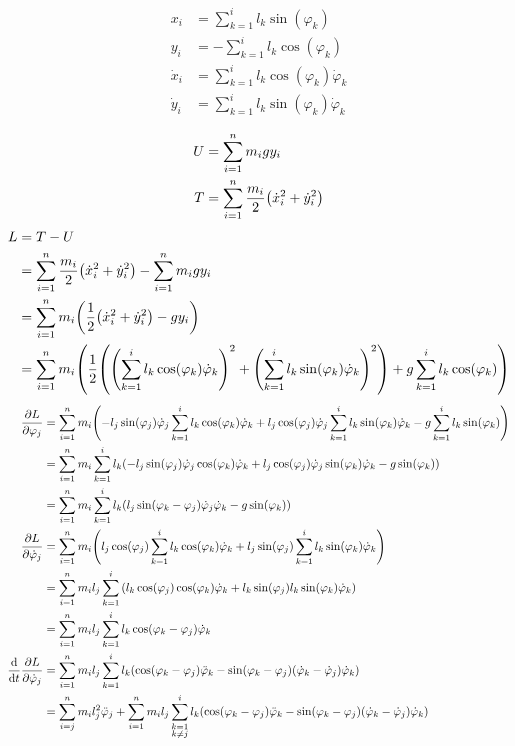 \documentclass{article}
\renewcommand{\phi}{\varphi}
\begin{document}
\begin{align*}
  x_i &= \sum_{k=1}^i l_k \sin(\phi_k) \\
  y_i &= - \sum_{k=1}^i l_k \cos(\phi_k) \\
  \dot x_i &= \sum_{k=1}^i l_k \cos(\phi_k) \dot\phi_k \\
  \dot y_i &= \sum_{k=1}^i l_k \sin(\phi_k) \dot\phi_k \\
\end{align*}
\begin{align*}
  U &= \sum_{i=1}^n m_i g y_i \\
  T &= \sum_{i=1}^n \frac{m_i}{2} \pqty{\dot x_i^2 + \dot y_i^2} \\
\end{align*}
\begin{align*}
  L &= T - U \\
    &= \sum_{i=1}^n \frac{m_i}{2} \pqty{\dot x_i^2 + \dot y_i^2} - \sum_{i=1}^n m_i g y_i \\
    &= \sum_{i=1}^n m_i \pqty{\frac{1}{2} \pqty{\dot x_i^2 + \dot y_i^2} - g y_i} \\
    &= \sum_{i=1}^n m_i \pqty{\frac{1}{2} \pqty{{\pqty{\sum_{k=1}^i l_k \cos(\phi_k) \dot\phi_k}}^2 + {\pqty{\sum_{k=1}^i l_k \sin(\phi_k) \dot\phi_k}}^2} + g \sum_{k=1}^i l_k \cos(\phi_k)} \\
\end{align*}
\begin{align*}
  \pdv{L}{\phi_j} &= \sum_{i=1}^n m_i \pqty{-l_j \sin(\phi_j) \dot\phi_j \sum_{k=1}^i l_k \cos(\phi_k) \dot\phi_k + l_j \cos(\phi_j) \dot\phi_j \sum_{k=1}^i l_k \sin(\phi_k) \dot\phi_k - g \sum_{k=1}^i l_k \sin(\phi_k)} \\
                  &= \sum_{i=1}^n m_i \sum_{k=1}^i l_k \pqty{-l_j \sin(\phi_j) \dot\phi_j \cos(\phi_k) \dot\phi_k + l_j \cos(\phi_j) \dot\phi_j \sin(\phi_k) \dot\phi_k - g \sin(\phi_k)} \\
                  &= \sum_{i=1}^n m_i \sum_{k=1}^i l_k \pqty{l_j \sin(\phi_k - \phi_j) \dot\phi_j \dot\phi_k - g \sin(\phi_k)} \\
  \pdv{L}{\dot\phi_j} &= \sum_{i=1}^n m_i \pqty{l_j \cos(\phi_j) \sum_{k=1}^i l_k \cos(\phi_k) \dot\phi_k + l_j \sin(\phi_j) \sum_{k=1}^i l_k \sin(\phi_k) \dot\phi_k} \\
                      &= \sum_{i=1}^n m_i l_j \sum_{k=1}^i \pqty{l_k \cos(\phi_j) \cos(\phi_k) \dot\phi_k + l_k \sin(\phi_j) l_k \sin(\phi_k) \dot\phi_k} \\
                      &= \sum_{i=1}^n m_i l_j \sum_{k=1}^i l_k \cos(\phi_k - \phi_j) \dot\phi_k \\
  \dv{t} \pdv{L}{\dot\phi_j} &= \sum_{i=1}^n m_i l_j \sum_{k=1}^i l_k \pqty{\cos(\phi_k - \phi_j) \ddot\phi_k - \sin(\phi_k - \phi_j)(\dot\phi_k - \dot\phi_j)\dot\phi_k} \\
                             &= \sum_{i=j}^n m_i l_j^2 \ddot\phi_j + \sum_{i=1}^n m_i l_j \sum_{\substack{k=1\\k \neq j}}^i l_k \pqty{\cos(\phi_k - \phi_j) \ddot\phi_k - \sin(\phi_k - \phi_j)(\dot\phi_k - \dot\phi_j)\dot\phi_k} \\
\end{align*}
\end{document}
